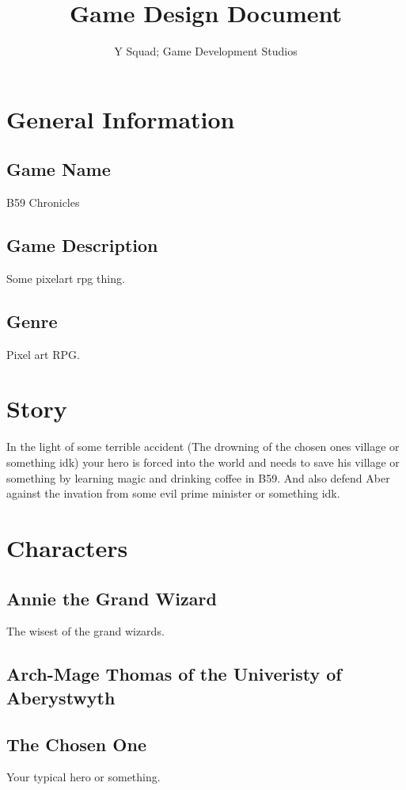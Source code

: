 \documentclass{article}
\begin{document}
\title{Game Design Document}
\author{Y Squad; Game Development Studios}

\maketitle
\newpage

\section{General Information}
\subsection{Game Name}
B59 Chronicles

\subsection{Game Description}
Some pixelart rpg thing.

\subsection{Genre}
Pixel art RPG.

\section{Story}
In the light of some terrible accident (The drowning of the
chosen ones village or something idk) your hero is forced
into the world and needs to save his village or something
by learning magic and drinking coffee in B59. And also
defend Aber against the invation from some evil prime minister
or something idk.

\section{Characters}
\subsection{Annie the Grand Wizard}
The wisest of the grand wizards.

\subsection{Arch-Mage Thomas of the Univeristy of Aberystwyth}

\subsection{The Chosen One}
Your typical hero or something.
\end{document}

